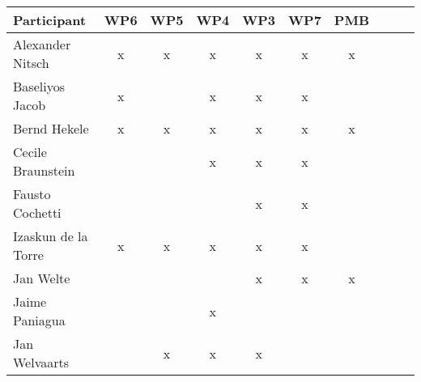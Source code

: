 \documentclass[a4paper, 11pt]{article}
\begin{document}
\begin{tabular}{|l|c|c|c||c|c|c||c|c|c|}
\hline
\textbf{Participant} & \textbf{WP6} &  \textbf{WP5} & \textbf{WP4}&  \textbf{WP3} & \textbf{WP7}&  \textbf{PMB} \\\hline
Alexander Nitsch     & x & x & x & x & x & x \\\hline  
Baseliyos Jacob      & x &   & x & x & x &   \\\hline 
Bernd Hekele         & x & x & x & x & x & x \\\hline
Cecile Braunstein    &   &   & x & x & x &   \\\hline
Fausto Cochetti      &   &   &   & x & x &   \\\hline
Izaskun de la Torre  & x & x & x & x & x &   \\\hline
Jan Welte            &   &   &   & x & x & x \\\hline
Jaime Paniagua       &   &   & x &   &   &   \\\hline
Jan Welvaarts        &   & x & x & x &   &   \\\hline

\end{tabular}
\end{document}
